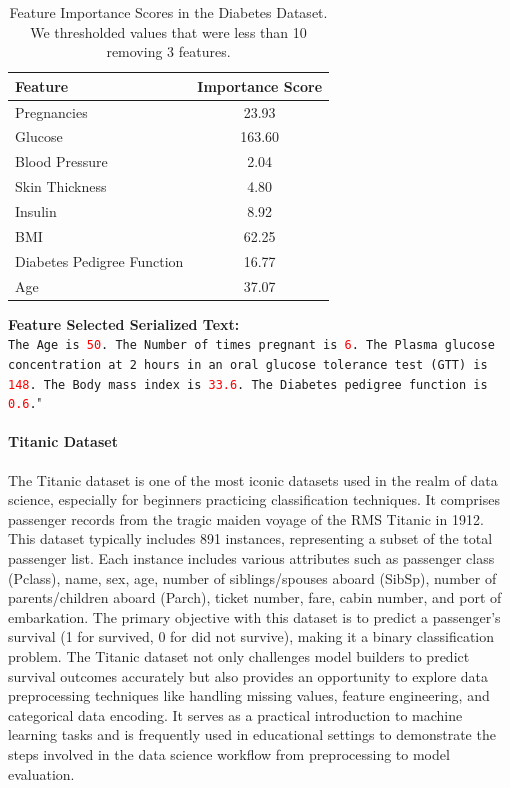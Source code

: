 \documentclass{article}
\theoremstyle{plain}
\theoremstyle{definition}
\theoremstyle{remark}
\begin{document}
\begin{table}[h!]
\centering
\begin{tabular}{lc}
\toprule
\textbf{Feature} & \textbf{Importance Score} \\
\midrule
Pregnancies & 23.93 \\
Glucose & 163.60 \\
Blood Pressure & 2.04 \\
Skin Thickness & 4.80 \\
Insulin & 8.92 \\
BMI & 62.25 \\
Diabetes Pedigree Function & 16.77 \\
Age & 37.07 \\
\bottomrule
\end{tabular}
\caption{Feature Importance Scores in the Diabetes Dataset. We thresholded values that were less than 10 removing 3 features.}
\label{tab:diabetes_feature_importance}
\end{table}
\newpage
\begin{mdframed}
\textbf{Feature Selected Serialized Text:}\\
\texttt{The Age is \textcolor{red}{50}. The Number of times pregnant is \textcolor{red}{6}. The Plasma glucose concentration at 2 hours in an oral glucose tolerance test (GTT) is \textcolor{red}{148}. The Body mass index is \textcolor{red}{33.6}. The Diabetes pedigree function is \textcolor{red}{0.6}.}"
\end{mdframed}

\paragraph{Titanic Dataset} The Titanic dataset \cite{eaton1995titanic} is one of the most iconic datasets used in the realm of data science, especially for beginners practicing classification techniques. It comprises passenger records from the tragic maiden voyage of the RMS Titanic in 1912. This dataset typically includes 891 instances, representing a subset of the total passenger list. Each instance includes various attributes such as passenger class (Pclass), name, sex, age, number of siblings/spouses aboard (SibSp), number of parents/children aboard (Parch), ticket number, fare, cabin number, and port of embarkation. The primary objective with this dataset is to predict a passenger’s survival (1 for survived, 0 for did not survive), making it a binary classification problem. The Titanic dataset not only challenges model builders to predict survival outcomes accurately but also provides an opportunity to explore data preprocessing techniques like handling missing values, feature engineering, and categorical data encoding. It serves as a practical introduction to machine learning tasks and is frequently used in educational settings to demonstrate the steps involved in the data science workflow from preprocessing to model evaluation.
\end{document}
